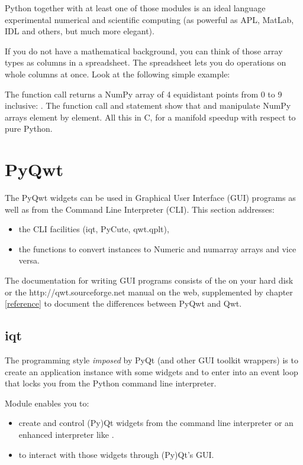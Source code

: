 \documentclass{manual}
\newcommand{\Qwt}{\ulink{Qwt}
  {http://qwt.sourceforge.net}}
\begin{document}
Python together with at least one of those modules is an ideal language
experimental numerical and scientific computing (as powerful as APL, MatLab,
IDL and others, but much more elegant).

If you do not have a mathematical background, you can think of those array
types as columns in a spreadsheet.  The spreadsheet lets you do operations
on whole columns at once.  Look at the following simple example:



The function call  returns a NumPy array of 4
equidistant points from 0 to 9 inclusive: .
The function call  and statement  show that
 and \samp{*} manipulate NumPy arrays element by element.
All this in C, for a manifold speedup with respect to pure Python.


\section{PyQwt \label{pyqwt-intro}}

The PyQwt widgets can be used in Graphical User Interface (GUI)
programs as well as from the Command Line Interpreter (CLI).
This section addresses:
\begin{itemize}
\item
  the CLI facilities (iqt, PyCute, qwt.qplt),
\item
  the functions to convert  instances to Numeric and numarray
  arrays and vice versa.
\end{itemize}

The documentation for writing GUI programs consists of the
 on your hard disk or the \Qwt{} manual on
the web, supplemented by chapter \ref{reference} to document the differences
between PyQwt and Qwt.

\subsection{iqt \label{iqt-intro}}

The programming style \emph{imposed} by PyQt (and other GUI toolkit wrappers)
is to create an application instance with some widgets and to enter into an
event loop that locks you from the Python command line interpreter.

Module  enables you to:
\begin{itemize}
\item
  create and control (Py)Qt widgets from the command line interpreter or an
  enhanced interpreter like .
\item
  to interact with those widgets through (Py)Qt's GUI.
\end{itemize}
\end{document}
